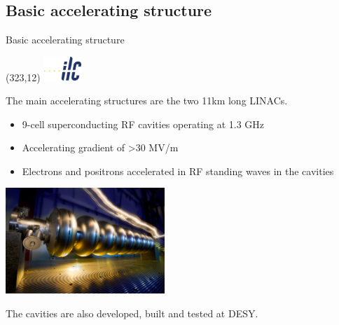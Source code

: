 \documentclass[xcolor={dvipsnames}]{beamer}
\newcommand{\ilclogo}{
  \setlength{\TPHorizModule}{1pt}
  \setlength{\TPVertModule}{1pt}
  \begin{textblock}{1}(323,12)
   \includegraphics[width=40pt,height=26pt]{figures/ILC.jpeg}
  \end{textblock}
}
\begin{document}
\subsection{Basic accelerating structure}
\begin{frame}{Basic accelerating structure}
\ilclogo
The main accelerating structures are the two 11km long LINACs.
\begin{itemize}
\item 9-cell superconducting RF cavities operating at 1.3 GHz 
\item Accelerating gradient of >30 MV/m
\item Electrons and positrons accelerated in RF standing waves in the cavities 
\end{itemize}
\begin{center}
\includegraphics[width=0.45\textwidth]{figures/cavity.jpg}
\end{center}
The cavities are also developed, built and tested at DESY.
\end{frame}
\end{document}

